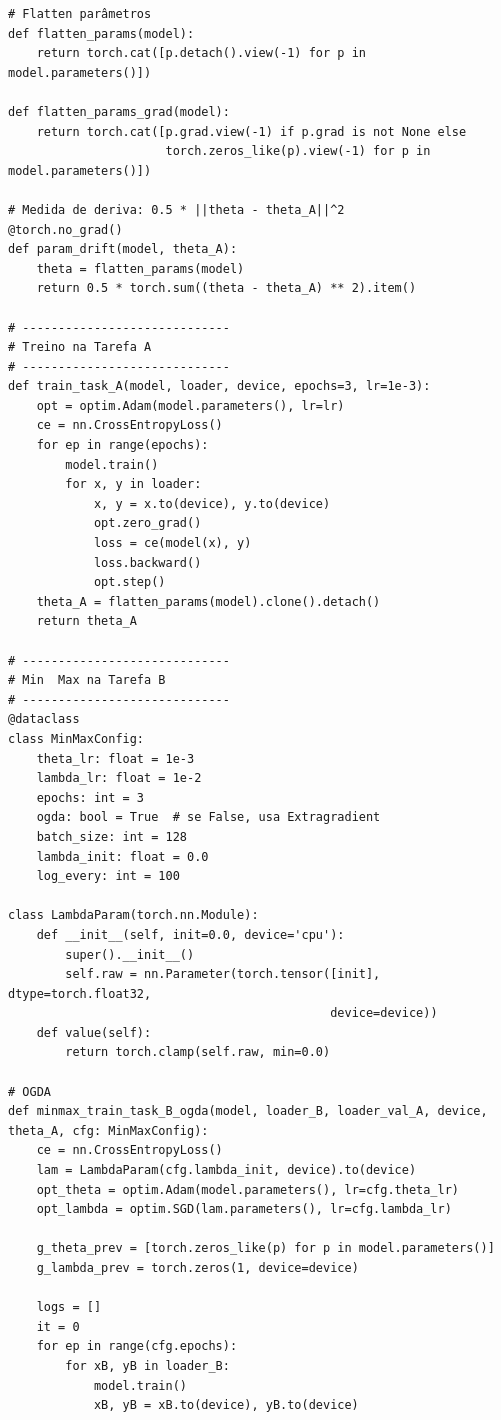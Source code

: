 \documentclass[9pt,a4paper]{extarticle}
\begin{document}
\begin{lstlisting}
# Flatten parâmetros
def flatten_params(model):
    return torch.cat([p.detach().view(-1) for p in model.parameters()])

def flatten_params_grad(model):
    return torch.cat([p.grad.view(-1) if p.grad is not None else
                      torch.zeros_like(p).view(-1) for p in model.parameters()])

# Medida de deriva: 0.5 * ||theta - theta_A||^2
@torch.no_grad()
def param_drift(model, theta_A):
    theta = flatten_params(model)
    return 0.5 * torch.sum((theta - theta_A) ** 2).item()

# -----------------------------
# Treino na Tarefa A
# -----------------------------
def train_task_A(model, loader, device, epochs=3, lr=1e-3):
    opt = optim.Adam(model.parameters(), lr=lr)
    ce = nn.CrossEntropyLoss()
    for ep in range(epochs):
        model.train()
        for x, y in loader:
            x, y = x.to(device), y.to(device)
            opt.zero_grad()
            loss = ce(model(x), y)
            loss.backward()
            opt.step()
    theta_A = flatten_params(model).clone().detach()
    return theta_A

# -----------------------------
# Min  Max na Tarefa B
# -----------------------------
@dataclass
class MinMaxConfig:
    theta_lr: float = 1e-3
    lambda_lr: float = 1e-2
    epochs: int = 3
    ogda: bool = True  # se False, usa Extragradient
    batch_size: int = 128
    lambda_init: float = 0.0
    log_every: int = 100

class LambdaParam(torch.nn.Module):
    def __init__(self, init=0.0, device='cpu'):
        super().__init__()
        self.raw = nn.Parameter(torch.tensor([init], dtype=torch.float32,
                                             device=device))
    def value(self):
        return torch.clamp(self.raw, min=0.0)

# OGDA
def minmax_train_task_B_ogda(model, loader_B, loader_val_A, device, theta_A, cfg: MinMaxConfig):
    ce = nn.CrossEntropyLoss()
    lam = LambdaParam(cfg.lambda_init, device).to(device)
    opt_theta = optim.Adam(model.parameters(), lr=cfg.theta_lr)
    opt_lambda = optim.SGD(lam.parameters(), lr=cfg.lambda_lr)

    g_theta_prev = [torch.zeros_like(p) for p in model.parameters()]
    g_lambda_prev = torch.zeros(1, device=device)

    logs = []
    it = 0
    for ep in range(cfg.epochs):
        for xB, yB in loader_B:
            model.train()
            xB, yB = xB.to(device), yB.to(device)


\end{lstlisting}
\end{document}
